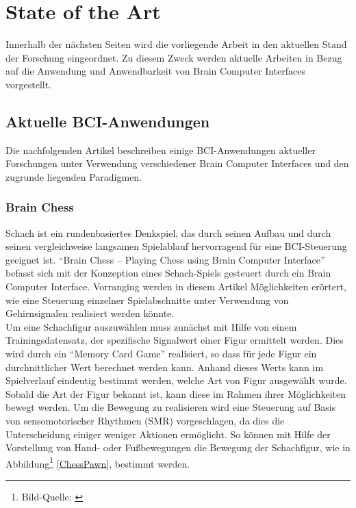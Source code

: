 \chapter{State of the Art}
Innerhalb der nächsten Seiten wird die vorliegende Arbeit in den aktuellen Stand der Forschung eingeordnet.
Zu diesem Zweck werden aktuelle Arbeiten in Bezug auf die Anwendung und Anwendbarkeit von Brain Computer Interfaces vorgestellt.\\


\section{Aktuelle BCI-Anwendungen}
Die nachfolgenden Artikel beschreiben einige BCI-Anwendungen aktueller Forschungen unter Verwendung verschiedener Brain Computer Interfaces und den zugrunde liegenden Paradigmen.\\

\subsection{Brain Chess}
\vspace{0.3cm}
\label{chessconcept}
Schach ist ein rundenbasiertes Denkspiel, das durch seinen Aufbau und durch seinen vergleichweise langsamen Spielablauf hervorragend für eine \acs{BCI}-Steuerung geeignet ist.
"`Brain Chess – Playing Chess using Brain Computer Interface"' \cite[S.1-5]{BCIChess} befasst sich mit der Konzeption eines Schach-Spiels gesteuert durch ein Brain Computer Interface.
Vorranging werden in diesem Artikel Möglichkeiten erörtert, wie eine Steuerung einzelner Spielabschnitte unter Verwendung von Gehirnsignalen realisiert werden könnte.\\


Um eine Schachfigur auszuwählen muss zunächst mit Hilfe von einem Trainingsdatensatz, der spezifische Signalwert einer Figur ermittelt werden.
Dies wird durch ein "`Memory Card Game"' realisiert, so dass für jede Figur ein durchnittlicher Wert berechnet werden kann.
Anhand dieses Werts kann im Spielverlauf eindeutig bestimmt werden, welche Art von Figur ausgewählt wurde.\\

Sobald die Art der Figur bekannt ist, kann diese im Rahmen ihrer Möglichkeiten bewegt werden. 
Um die Bewegung zu realisieren wird eine Steuerung auf Basis von sensomotorischer Rhythmen (\acs{SMR}) vorgeschlagen, da dies die Unterscheidung einiger weniger Aktionen ermöglicht.
So können mit Hilfe der Vorstellung von Hand- oder Fußbewegungen die Bewegung der Schachfigur, wie in Abbildung\footnote[1]{Bild-Quelle: \cite[S.4]{BCIChess}} \ref{ChessPawn}, bestimmt werden.\\

